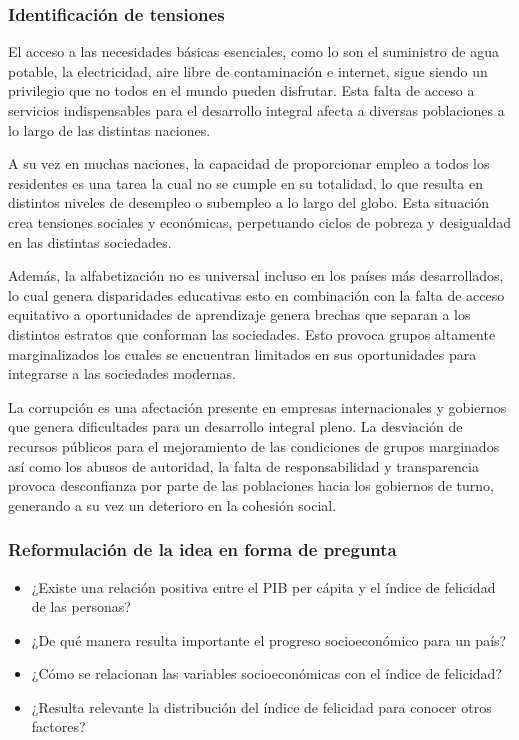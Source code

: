 \documentclass[12pt,oneside,letterpaper,spanish]{article}
\begin{document}
\newpage
\subsubsection{Identificación de tensiones}
El acceso a las necesidades básicas esenciales, como lo son el suministro de agua potable, la electricidad, aire libre de contaminación e internet, sigue siendo un privilegio que no todos en el mundo pueden disfrutar. Esta falta de acceso a servicios indispensables para el desarrollo integral afecta a diversas poblaciones a lo largo de las distintas naciones.  

A su vez en muchas naciones, la capacidad de proporcionar empleo a todos los residentes es una tarea la cual no se cumple en su totalidad, lo que resulta en distintos niveles de desempleo o subempleo a lo largo del globo. Esta situación crea tensiones sociales y económicas, perpetuando ciclos de pobreza y desigualdad en las distintas sociedades.  

Además, la alfabetización no es universal incluso en los países más desarrollados, lo cual genera disparidades educativas esto en combinación con la falta de acceso equitativo a oportunidades de aprendizaje genera brechas que separan a los distintos estratos que conforman las sociedades. Esto provoca grupos altamente marginalizados los cuales se encuentran limitados en sus oportunidades para integrarse a las sociedades modernas.  

La corrupción es una afectación presente en empresas internacionales y gobiernos que genera dificultades para un desarrollo integral pleno. La desviación de recursos públicos para el mejoramiento de las condiciones de grupos marginados así como los abusos de autoridad, la falta de responsabilidad y transparencia provoca desconfianza por parte de las poblaciones hacia los gobiernos de turno, generando a su vez un deterioro en la cohesión social.  

\subsubsection{Reformulación de la idea en forma de pregunta}
\begin{itemize}
    \item ¿Existe una relación positiva entre el PIB per cápita y el índice de felicidad de las personas?
    \item ¿De qué manera resulta importante el progreso socioeconómico para un país?
    \item ¿Cómo se relacionan las variables socioeconómicas con el índice de felicidad?
    \item ¿Resulta relevante la distribución del índice de felicidad para conocer otros factores?
\end{itemize}
\end{document}
